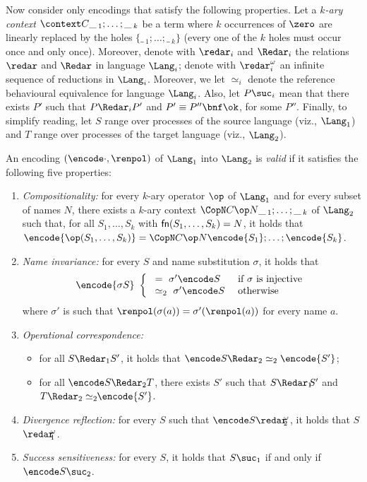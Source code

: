 \documentclass{LMCS}
\renewcommand{\beq}{\simeq}
\begin{document}
Now consider only encodings that satisfy the following properties.
Let a {\em $k$-ary
context} $\context C {\_\,_1; \ldots; \_\,_k}$ be a term where $k$
occurrences of $\zero$ are linearly replaced by the holes $\{\_\,_1;
\ldots; \_\,_k\}$ (every one of the $k$ holes must occur once and only once).
Moreover, denote with $\redar_i$ and $\Redar_i$ 
the relations $\redar$ and $\Redar$ in language $\Lang_i$;
denote with $\redar^\omega_i$ an infinite sequence of reductions in $\Lang_i$.
Moreover, we let $\beq_i$ denote the reference behavioural equivalence for language $\Lang_i$.
Also, let $P \suc_i$ mean that there exists $P'$ such that $P \Redar_i P'$ and $P' \equiv P''\bnf \ok$,
for some $P''$.
Finally, to simplify reading, let $S$ range
over processes of the source language (viz., $\Lang_1$) and $T$ range
over processes of the target language (viz., $\Lang_2$).

\begin{defi}
\label{def:ve}
An encoding $(\encode\cdot,\renpol)$ of $\Lang_1$ into $\Lang_2$
is {\em valid} if it satisfies the following five properties:
\begin{enumerate}
\item {\em Compositionality:} for every $k$-ary operator $\op$ of $\Lang_1$
and for every subset of names $N$,
there exists a $k$-ary context $\CopN C \op N {\_\,_1; \ldots; \_\,_k}$ of $\Lang_2$
such that, for all $S_1,\ldots,S_k$ with ${\sf fn}(S_1,\ldots,S_k) = N$, it holds
that $\encode{\op(S_1,\ldots,S_k)} = \CopN C \op N {\encode{S_1};\ldots;\encode{S_k}}$.

\item {\em Name invariance:}
for every $S$ and name substitution $\sigma$, it holds that
$$
\encode{\sigma S}\ \left\{ 
\begin{array}{ll}
\ =\ \sigma'\encode S& \mbox{ if $\sigma $ is injective}\\
\ \beq_2\ \sigma'\encode S  & \mbox{ otherwise}
\end{array}
\right.
$$
where $\sigma'$ is such that 
$\renpol(\sigma(a)) = \sigma'(\renpol(a))$
for every name $a$.

\item {\em Operational correspondence:}
\begin{itemize}
\item for all $S \Redar_1 S'$, it holds that $\encode S \Redar_2 \beq_2 \encode {S'}$;
\item for all $\encode S \Redar_2 T$, there exists $S'$ such that $S \Redar_1\!\! S'$ 
and $T \Redar_2 \beq_2\!\! \encode {S'}$.
\end{itemize}

\item {\em Divergence reflection:}
for every $S$ such that 
$\encode S \redar\!\!_2^\omega$, it holds that 
\linebreak $S$ \mbox{$\redar\!\!_1^\omega$}.

\item {\em Success sensitiveness:}
for every $S$, it holds that $S \suc_1$ if and only if $\encode S \suc_2$.
\end{enumerate}
\end{defi}
\end{document}
